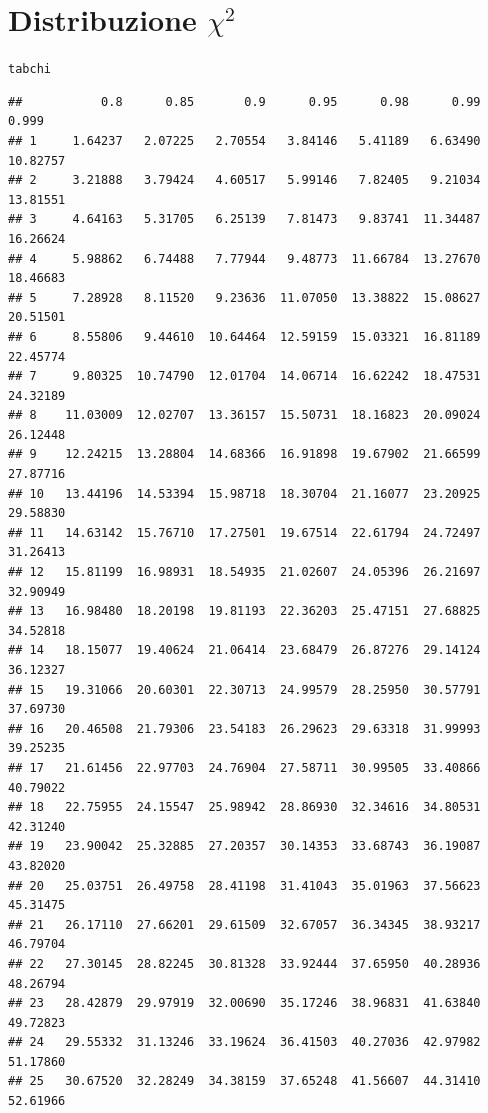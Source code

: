 \documentclass[onecolumn,12pt]{book}\usepackage[]{graphicx}\usepackage[]{color}
\makeatletter
\newcommand{\hlstd}[1]{\textcolor[rgb]{0.345,0.345,0.345}{#1}}%
\newenvironment{kframe}{%
 \def\at@end@of@kframe{}%
 \ifinner\ifhmode%
  \def\at@end@of@kframe{\end{minipage}}%
  \begin{minipage}{\columnwidth}%
 \fi\fi%
 \def\FrameCommand##1{\hskip\@totalleftmargin \hskip-\fboxsep
 \colorbox{shadecolor}{##1}\hskip-\fboxsep
     \hskip-\linewidth \hskip-\@totalleftmargin \hskip\columnwidth}%
 \MakeFramed {\advance\hsize-\width
   \@totalleftmargin\z@ \linewidth\hsize
   \@setminipage}}%
 {\par\unskip\endMakeFramed%
 \at@end@of@kframe}
\newenvironment{knitrout}{}{} %
\makeatother
\begin{document}
\section*{Distribuzione $\chi^2$}
\oddsidemargin 0.0in
\evensidemargin 0.0in
\topmargin -0.4in
\small
\begin{knitrout}
\color{fgcolor}\begin{kframe}
\begin{alltt}
\hlstd{tabchi}
\end{alltt}
\begin{verbatim}
##           0.8      0.85       0.9      0.95      0.98      0.99     0.999
## 1     1.64237   2.07225   2.70554   3.84146   5.41189   6.63490  10.82757
## 2     3.21888   3.79424   4.60517   5.99146   7.82405   9.21034  13.81551
## 3     4.64163   5.31705   6.25139   7.81473   9.83741  11.34487  16.26624
## 4     5.98862   6.74488   7.77944   9.48773  11.66784  13.27670  18.46683
## 5     7.28928   8.11520   9.23636  11.07050  13.38822  15.08627  20.51501
## 6     8.55806   9.44610  10.64464  12.59159  15.03321  16.81189  22.45774
## 7     9.80325  10.74790  12.01704  14.06714  16.62242  18.47531  24.32189
## 8    11.03009  12.02707  13.36157  15.50731  18.16823  20.09024  26.12448
## 9    12.24215  13.28804  14.68366  16.91898  19.67902  21.66599  27.87716
## 10   13.44196  14.53394  15.98718  18.30704  21.16077  23.20925  29.58830
## 11   14.63142  15.76710  17.27501  19.67514  22.61794  24.72497  31.26413
## 12   15.81199  16.98931  18.54935  21.02607  24.05396  26.21697  32.90949
## 13   16.98480  18.20198  19.81193  22.36203  25.47151  27.68825  34.52818
## 14   18.15077  19.40624  21.06414  23.68479  26.87276  29.14124  36.12327
## 15   19.31066  20.60301  22.30713  24.99579  28.25950  30.57791  37.69730
## 16   20.46508  21.79306  23.54183  26.29623  29.63318  31.99993  39.25235
## 17   21.61456  22.97703  24.76904  27.58711  30.99505  33.40866  40.79022
## 18   22.75955  24.15547  25.98942  28.86930  32.34616  34.80531  42.31240
## 19   23.90042  25.32885  27.20357  30.14353  33.68743  36.19087  43.82020
## 20   25.03751  26.49758  28.41198  31.41043  35.01963  37.56623  45.31475
## 21   26.17110  27.66201  29.61509  32.67057  36.34345  38.93217  46.79704
## 22   27.30145  28.82245  30.81328  33.92444  37.65950  40.28936  48.26794
## 23   28.42879  29.97919  32.00690  35.17246  38.96831  41.63840  49.72823
## 24   29.55332  31.13246  33.19624  36.41503  40.27036  42.97982  51.17860
## 25   30.67520  32.28249  34.38159  37.65248  41.56607  44.31410  52.61966

\end{verbatim}
\end{kframe}
\end{knitrout}
\end{document}

